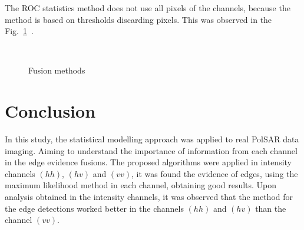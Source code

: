 \documentclass[conference]{IEEEtran}
\begin{document}
The ROC statistics method does not use all pixels of the channels, because the method is based on thresholds discarding pixels. This was observed in the Fig.~\ref{fusion_met}~.

\begin{figure}[!ht]
     \hfill
     \\
     \hfill
     \caption{Fusion methods}
     \label{fusion_met}
   \end{figure}

\section{Conclusion}\label{sec_09}
In this study, the statistical modelling approach was applied to real PolSAR data imaging. Aiming to understand the importance of information from each channel in the edge evidence fusions. The proposed algorithms were applied in intensity channels $(hh)$, $(hv)$ and $(vv)$, it was found the evidence of edges, using the maximum likelihood  method in each channel, obtaining good results. Upon analysis obtained in the intensity channels, it was observed that the method for the edge detections worked better in the channels $(hh)$ and $(hv)$ than the channel $(vv)$.
\end{document}
